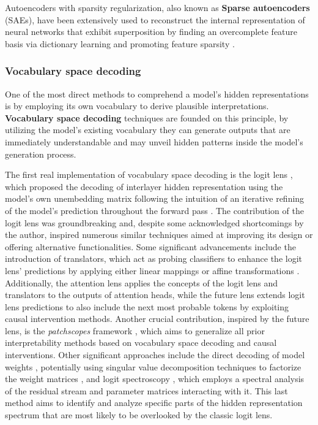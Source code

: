 
Autoencoders with sparsity regularization, also known as \textbf{Sparse autoencoders} (SAEs), have been extensively used to reconstruct the internal representation of neural networks that exhibit superposition by finding an overcomplete feature basis via dictionary learning and promoting feature sparsity \cite{bricken2023, huben2024}.

\subsubsection{Vocabulary space decoding}

One of the most direct methods to comprehend a model's hidden representations is by employing its own vocabulary to derive plausible interpretations. \textbf{Vocabulary space decoding} techniques are founded on this principle, by utilizing the model's existing vocabulary they can generate outputs that are immediately understandable and may unveil hidden patterns inside the model's generation process.

The first real implementation of vocabulary space decoding is the logit lens \cite{nostalgebraist2020}, which proposed the decoding of interlayer hidden representation using the model's own unembedding matrix following the intuition of an iterative refining of the model's prediction throughout the forward pass \cite{jastrzebski2018}.
The contribution of the logit lens was groundbreaking and, despite some acknowledged shortcomings by the author, inspired numerous similar techniques aimed at improving its design or offering alternative functionalities.
Some significant advancements include the introduction of translators, which act as probing classifiers to enhance the logit lens' predictions by applying either linear mappings \cite{din2024} or affine transformations \cite{belrose2023a}.
Additionally, the attention lens \cite{sakarvadia2023} applies the concepts of the logit lens and translators to the outputs of attention heads, while the future lens \cite{pal2023} extends logit lens predictions to also include the next most probable tokens by exploiting causal intervention methods.
Another crucial contribution, inspired by the future lens, is the \emph{patchscopes} framework \cite{ghandeharioun2024}, which aims to generalize all prior interpretability methods based on vocabulary space decoding and causal interventions.
Other significant approaches include the direct decoding of model weights \cite{dar2023}, potentially using singular value decomposition techniques to factorize the weight matrices \cite{millidge2022}, and logit spectroscopy \cite{cancedda2024}, which employs a spectral analysis of the residual stream and parameter matrices interacting with it.
This last method aims to identify and analyze specific parts of the hidden representation spectrum that are most likely to be overlooked by the classic logit lens.


